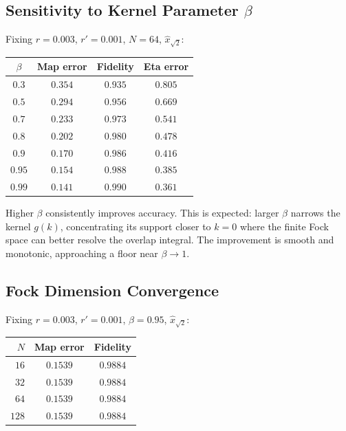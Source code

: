 \documentclass[11pt]{article}
\begin{document}
\subsection{Sensitivity to Kernel Parameter $\beta$}

Fixing $r = 0.003$, $r' = 0.001$, $N = 64$, $\hat{x}_{\sqrt{2}}$:

\begin{center}
\begin{tabular}{cccc}
  \toprule
  $\beta$ & Map error & Fidelity & Eta error \\
  \midrule
  $0.3$ & $0.354$ & $0.935$ & $0.805$ \\
  $0.5$ & $0.294$ & $0.956$ & $0.669$ \\
  $0.7$ & $0.233$ & $0.973$ & $0.541$ \\
  $0.8$ & $0.202$ & $0.980$ & $0.478$ \\
  $0.9$ & $0.170$ & $0.986$ & $0.416$ \\
  $0.95$ & $\mathbf{0.154}$ & $\mathbf{0.988}$ & $\mathbf{0.385}$ \\
  $0.99$ & $0.141$ & $0.990$ & $0.361$ \\
  \bottomrule
\end{tabular}
\end{center}

Higher $\beta$ consistently improves accuracy.  This is expected: larger
$\beta$ narrows the kernel $g(k)$, concentrating its support closer to
$k = 0$ where the finite Fock space can better resolve the overlap integral.
The improvement is smooth and monotonic, approaching a floor near
$\beta \to 1$.

\subsection{Fock Dimension Convergence}

Fixing $r = 0.003$, $r' = 0.001$, $\beta = 0.95$, $\hat{x}_{\sqrt{2}}$:

\begin{center}
\begin{tabular}{rcc}
  \toprule
  $N$ & Map error & Fidelity \\
  \midrule
  $16$ & $0.1539$ & $0.9884$ \\
  $32$ & $0.1539$ & $0.9884$ \\
  $64$ & $0.1539$ & $0.9884$ \\
  $128$ & $0.1539$ & $0.9884$ \\
  \bottomrule
\end{tabular}
\end{center}
\end{document}
